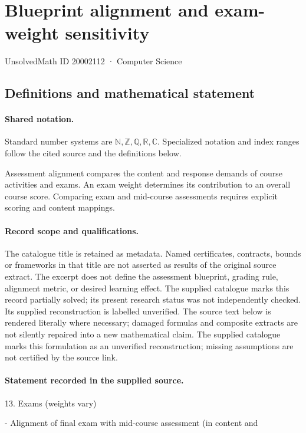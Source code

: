 \documentclass[11pt]{article}
\begin{document}
\setcounter{section}{20002111}
\section{Blueprint alignment and exam-weight sensitivity}\label{20002112}
{\small\sffamily UnsolvedMath ID 20002112 · Computer Science}
\subsection{Definitions and mathematical statement}

\paragraph{Shared notation.}Standard number systems are $\mathbb N,\mathbb Z,\mathbb Q,\mathbb R,\mathbb C$. Specialized notation and index ranges follow the cited source and the definitions below.


Assessment alignment compares the content and response demands of course activities and exams. An exam weight determines its contribution to an overall course score. Comparing exam and mid-course assessments requires explicit scoring and content mappings.
\paragraph{Record scope and qualifications.}
The catalogue title is retained as metadata. Named certificates, contracts, bounds or frameworks in that title are not asserted as results of the original source extract.
The excerpt does not define the assessment blueprint, grading rule, alignment metric, or desired learning effect. The supplied catalogue marks this record partially solved; its present research status was not independently checked. Its supplied reconstruction is labelled unverified.
The source text below is rendered literally where necessary; damaged formulas and composite extracts are not silently repaired into a new mathematical claim.
The supplied catalogue marks this formulation as an unverified reconstruction; missing assumptions are not certified by the source link.
\paragraph{Statement recorded in the supplied source.}
13. Exams (weights vary)

- Alignment of final exam with mid-course assessment (in content and
\end{document}
